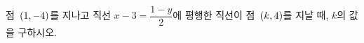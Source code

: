 점~$(1{,}\mkern3mu\mathopen{}-4)$를 지나고 직선 $x-3=\dfrac{1-y}{2}$에 평행한 직선이 점~$(k{,}\mkern3mu\mathopen{}4)$를 지날 때, $k$의 값을 구하시오.
